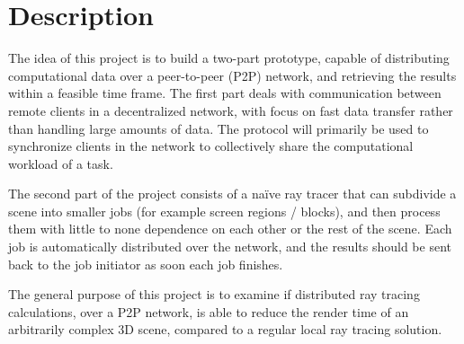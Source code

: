 \chapter{Description}


The idea of this project is to build a two-part prototype, capable of distributing computational data over a peer-to-peer (P2P) network, and retrieving the results within a feasible time frame. The first part deals with communication between remote clients in a decentralized network, with focus on fast data transfer rather than handling large amounts of data. The protocol will primarily be used to synchronize clients in the network to collectively share the computational workload of a task. 

The second part of the project consists of a naïve ray tracer that can subdivide a scene into smaller jobs (for example screen regions / blocks), and then process them with little to none dependence on each other or the rest of the scene. Each job is automatically distributed over the network, and the results should be sent back to the job initiator as soon each job finishes.

The general purpose of this project is to examine if distributed ray tracing calculations, over a P2P network, is able to reduce the render time of an arbitrarily complex 3D scene, compared to a regular local ray tracing solution. 

 